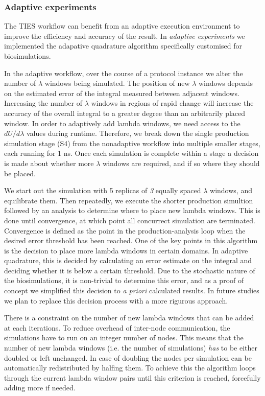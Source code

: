 
\subsubsection{Adaptive experiments}

The TIES workflow can benefit from an adaptive execution environment to improve
the efficiency and accuracy of the result. In \emph{adaptive experiments} we
implemented the adapative quadrature algorithm specifically customised for
biosimulations.

In the adaptive workflow, over the course of a protocol instance we alter
the number of $\lambda$ windows being simulated. The position of new $\lambda$
windows depends on the estimated error of the integral measured between
adjacent windows. Increasing the number of $\lambda$ windows in regions of
rapid change will increase the accuracy of the overall integral to a greater
degree than an
arbitrarily placed window. In order to adaptively add lambda windows, we need
access to the $dU/d\lambda$ values during runtime. Therefore, we break down the
single production simulation stage (S4) from the nonadaptive workflow into
multiple smaller stages, each running for 1 ns. Once each simulation is
complete within a stage a decision is made about whether more $\lambda$ windows
are required, and if so where they should be placed.

We start out the simulation with 5 replicas of \emph{3} equally spaced
$\lambda$ windows, and equilibrate them. Then repeatedly, we execute the
shorter production simultion followed by an analysis to determine where to
place new lambda windows. This is done until convergence, at which point all
concurrect simulation are terminated. Convergence is defined as the point in
the production-analysis loop when the desired error threshold has been
reached.  One of the key points in this algorithm is the decision to place more
lambda windows in certain domains. In adaptive quadrature, this is decided by
calculating an error estimate on the integral and deciding whether it is below
a certain threshold. Due to the stochastic nature of the biosimulations, it is
non-trivial to determine this error, and as a proof of concept we simplified
this decision to {\it a priori} calculated results. In future studies we plan
to replace this decision process with a more rigurous approach.

There is a constraint on the number of new lambda windows that can be added at
each iterations. To reduce overhead of inter-node communication, the
simulations have to run on an integer number of nodes. This means that the
number of new lambda windows (i.e. the number of simulations) \emph{has} to be
either doubled or left unchanged. In case of doubling the nodes per simulation can be automatically redistributed by halfing them. To achieve this the algorithm loops through the current lambda window pairs until this criterion is reached, forcefully adding more if needed.


